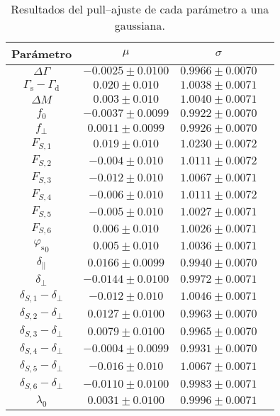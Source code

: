 \begin{subappendices}
\begin{table}[H]
  \centering
  \begin{tabular}{cccc}
  \toprule
  Parámetro & $\mu$ & $\sigma$ & \\ 
  \midrule
$\Delta \Gamma$ &  $-0.0025 \pm 0.0100$ &  $0.9966 \pm 0.0070$ & \\
$\Gamma_{\mathrm{s}} - \Gamma_{\mathrm{d}}$ &  $0.020 \pm 0.010$ &  $1.0038 \pm 0.0071$ & \\
$\Delta M$ &  $0.003 \pm 0.010$ &  $1.0040 \pm 0.0071$ & \\
$f_{0}$ &  $-0.0037 \pm 0.0099$ &  $0.9922 \pm 0.0070$ & \\
$f_{\perp}$ &  $0.0011 \pm 0.0099$ &  $0.9926 \pm 0.0070$ & \\
$F_{S,1}$ &  $0.019 \pm 0.010$ &  $1.0230 \pm 0.0072$ & \\
$F_{S,2}$ &  $-0.004 \pm 0.010$ &  $1.0111 \pm 0.0072$ & \\
$F_{S,3}$ &  $-0.012 \pm 0.010$ &  $1.0067 \pm 0.0071$ & \\
$F_{S,4}$ &  $-0.006 \pm 0.010$ &  $1.0111 \pm 0.0072$ & \\
$F_{S,5}$ &  $-0.005 \pm 0.010$ &  $1.0027 \pm 0.0071$ & \\
$F_{S,6}$ &  $0.006 \pm 0.010$ &  $1.0026 \pm 0.0071$ & \\
${\varphi_{\mathrm{s}}}_0$ &  $0.005 \pm 0.010$ &  $1.0036 \pm 0.0071$ & \\
$\delta_{\parallel}$ &  $0.0166 \pm 0.0099$ &  $0.9940 \pm 0.0070$ & \\
$\delta_{\perp}$ &  $-0.0144 \pm 0.0100$ &  $0.9972 \pm 0.0071$ & \\
$\delta_{S,1}- \delta_{\perp}$ &  $-0.012 \pm 0.010$ &  $1.0046 \pm 0.0071$ & \\
$\delta_{S,2}- \delta_{\perp}$ &  $0.0127 \pm 0.0100$ &  $0.9963 \pm 0.0070$ & \\
$\delta_{S,3}- \delta_{\perp}$ &  $0.0079 \pm 0.0100$ &  $0.9965 \pm 0.0070$ & \\
$\delta_{S,4}- \delta_{\perp}$ &  $-0.0004 \pm 0.0099$ &  $0.9931 \pm 0.0070$ & \\
$\delta_{S,5}- \delta_{\perp}$ &  $-0.016 \pm 0.010$ &  $1.0067 \pm 0.0071$ & \\
$\delta_{S,6}- \delta_{\perp}$ &  $-0.0110 \pm 0.0100$ &  $0.9983 \pm 0.0071$ & \\
$\lambda_0$ &  $0.0031 \pm 0.0100$ &  $0.9996 \pm 0.0071$ & \\
  \bottomrule  
  \end{tabular}
  \caption{Resultados del pull--ajuste de cada parámetro a una gaussiana.}
\end{table}





\end{subappendices}
